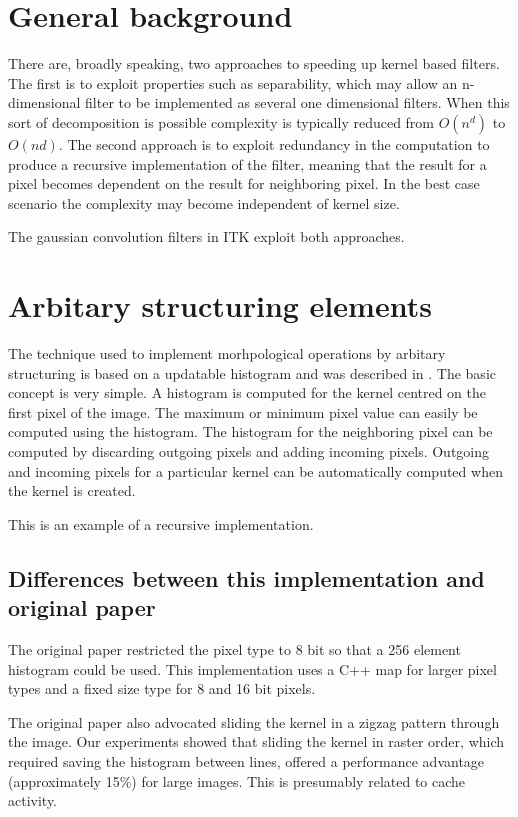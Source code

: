 \documentclass{InsightArticle}
\begin{document}
\section{General background}
There are, broadly speaking, two approaches to speeding up kernel
based filters. The first is to exploit properties such as
separability, which may allow an n-dimensional filter to be
implemented as several one dimensional filters. When this sort of
decomposition is possible complexity is typically reduced from
$O(n^d)$ to $O(nd)$. The second approach is to exploit redundancy in
the computation to produce a recursive implementation of the filter,
meaning that the result for a pixel becomes dependent on the result
for neighboring pixel. In the best case scenario the complexity may
become independent of kernel size.

The gaussian convolution filters in ITK exploit both approaches.

\section{Arbitary structuring elements}
\label{sect:movingHist} 
The technique used to implement morhpological operations by arbitary
structuring is based on a updatable histogram and was described in
\cite{Vandroogenbroeck96.3}. The basic concept is very simple. 
A histogram is computed for the kernel centred on the first pixel of
the image. The maximum or minimum pixel value can easily be computed
using the histogram. The histogram for the neighboring pixel can be
computed by discarding outgoing pixels and adding incoming
pixels. Outgoing and incoming pixels for a particular kernel can be
automatically computed when the kernel is created.

This is an example of a recursive implementation.

\subsection{Differences between this implementation and original paper}
The original paper restricted the pixel type to 8 bit so that a 256
element histogram could be used. This implementation uses a C++ map
for larger pixel types and a fixed size type for 8 and 16 bit pixels.

The original paper also advocated sliding the kernel in a zigzag
pattern through the image. Our experiments showed that sliding the
kernel in raster order, which required saving the histogram between
lines, offered a performance advantage (approximately 15\%) for large
images. This is presumably related to cache activity.
\end{document}
